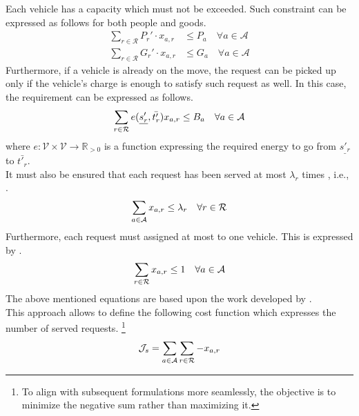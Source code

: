 Each vehicle has a capacity which must not be exceeded. Such constraint can be expressed as follows for both people and goods. 
\begin{align}
	\sum_{r \in \mathcal{R}} P_r' \cdot x_{a,r} &\leq P_a \quad \forall a \in \mathcal{A}\label{eq:cons_quantity_p}\\
	\sum_{r \in \mathcal{R}} G_r' \cdot x_{a,r} &\leq G_a \quad \forall a \in \mathcal{A}\label{eq:cons_quantity_g}
\end{align}
Furthermore, if a vehicle is already on the move, the request can be picked up only if the vehicle's charge is enough to satisfy such request as well. In this case, the requirement can be expressed as follows. 
\begin{equation}
	\sum_{r \in \mathcal{R}} e(\underline{s'_r}, \bar{t'_r}) x_{a,r}\leq B_a \quad \forall a \in \mathcal{A}\\
	\label{eq:cons_charg}
\end{equation}
where $e: \mathcal{V} \times \mathcal{V} \rightarrow \mathbb{R}_{>0}$ is a function expressing the required energy to go from $\underline{s'_r}$ to $\bar{t'_r}$.\\
It must also be ensured that each request has been served at most $\lambda_r$ times , i.e., . 
\begin{equation}
	\sum_{a \in \mathcal{A}} x_{a,r} \leq \lambda_r \quad \forall r \in \mathcal{R}\\
	\label{eq:req_served}
\end{equation}
Furthermore, each request must assigned at most to one vehicle. This is expressed by . 
\begin{equation}
	\sum_{r \in \mathcal{R}} x_{a,r} \leq 1\quad \forall a \in \mathcal{A}\\
	\label{eq:req_served_per_vehicle}
\end{equation}
The above mentioned equations are based upon the work developed by . \\
This approach allows to define the following cost function which expresses the number of served requests. \footnote{To align with subsequent formulations more seamlessly, the objective is to minimize the negative sum rather than maximizing it.}
\begin{equation}
	\mathcal{J}_s = \sum_{a \in \mathcal{A}}\sum_{r \in \mathcal{R}} -x_{a,r}\\
	\label{eq:req_served_cfunction}
\end{equation}

